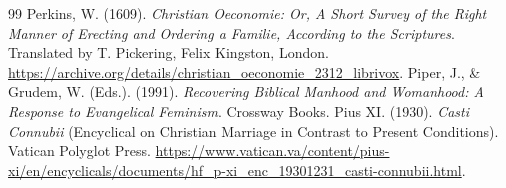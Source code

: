 \documentclass[11pt,twocolumn]{article}
\begin{document}
\begin{thebibliography}{99}
 Perkins, W. (1609). \textit{Christian Oeconomie: Or, A Short Survey of the Right Manner of Erecting and Ordering a Familie, According to the Scriptures}. Translated by T. Pickering, Felix Kingston, London. \url{https://archive.org/details/christian_oeconomie_2312_librivox}.
 Piper, J., \& Grudem, W. (Eds.). (1991). \textit{Recovering Biblical Manhood and Womanhood: A Response to Evangelical Feminism}. Crossway Books.
 Pius XI. (1930). \textit{Casti Connubii} (Encyclical on Christian Marriage in Contrast to Present Conditions). Vatican Polyglot Press. \url{https://www.vatican.va/content/pius-xi/en/encyclicals/documents/hf_p-xi_enc_19301231_casti-connubii.html}.
\end{thebibliography}
\end{document}
